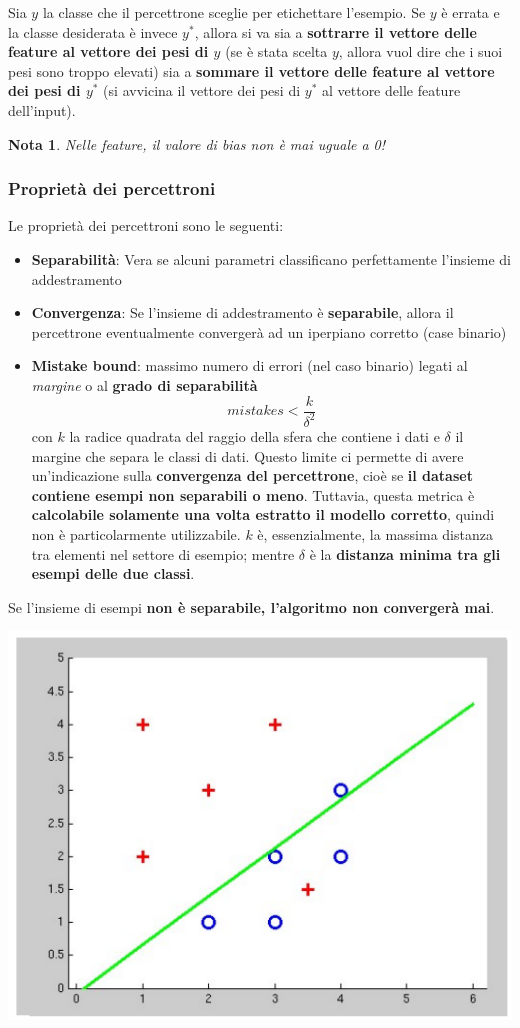 \documentclass[12pt]{article}
\newtheorem{Nota}{Nota}[subsection]
\begin{document}
Sia $y$ la classe che il percettrone sceglie per etichettare l'esempio.
Se $y$ è errata e la classe desiderata è invece $y^*$, allora si va sia a \textbf{sottrarre il vettore delle feature al vettore dei pesi di $y$} (se è stata scelta $y$, allora vuol dire che i suoi pesi sono troppo elevati) sia a
\textbf{sommare il vettore delle feature al vettore dei pesi di $y^*$} (si avvicina il vettore dei pesi di $y^*$ al vettore delle feature dell'input).
\begin{Nota}
    Nelle feature, il valore di bias non è mai uguale a 0!
\end{Nota}
\subsubsection{Proprietà dei percettroni}
Le proprietà dei percettroni sono le seguenti:
\begin{itemize}
    \item \textbf{Separabilità}: Vera se alcuni parametri classificano perfettamente l'insieme di addestramento 
    \item \textbf{Convergenza}: Se l'insieme di addestramento è \textbf{separabile}, allora il percettrone eventualmente convergerà ad un iperpiano corretto (case binario)
    \item \textbf{Mistake bound}: massimo numero di errori (nel caso binario) legati al \textit{margine} o al \textbf{grado di separabilità}
    $$mistakes < \frac{k}{\delta^2}$$
    con $k$ la radice quadrata del raggio della sfera che contiene i dati e $\delta$ il margine che separa le classi di dati.
    Questo limite ci permette di avere un'indicazione sulla \textbf{convergenza del percettrone}, cioè se \textbf{il dataset contiene esempi non separabili o meno}.
    Tuttavia, questa metrica è \textbf{calcolabile solamente una volta estratto il modello corretto}, quindi non è particolarmente utilizzabile.
    $k$ è, essenzialmente, la massima distanza tra elementi nel settore di esempio; mentre $\delta$ è la \textbf{distanza minima tra gli esempi delle due classi}.
\end{itemize}
Se l'insieme di esempi \textbf{non è separabile, l'algoritmo non convergerà mai}.
\begin{center}
    \includegraphics[width =0.60\linewidth]{Images/98.PNG}
\end{center}
\end{document}
